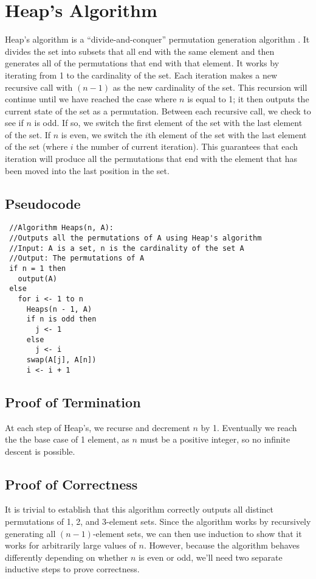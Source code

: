 \documentclass[10pt, oneside]{article}   	%
\begin{document}
\section{Heap's Algorithm}
Heap's algorithm is a ``divide-and-conquer'' permutation generation algorithm \cite{heap}. It divides the set into subsets that all end with the same element and then generates all of the permutations that end with that element. It works by iterating from 1 to the cardinality of the set. Each iteration makes a new recursive call with $(n - 1)$ as the new cardinality of the set. This recursion will continue until we have reached the case where $n$ is equal to 1; it then outputs the current state of the set as a permutation. Between each recursive call, we check to see if $n$ is odd. If so, we switch the first element of the set with the last element of the set. If $n$ is even, we switch the $i$th element of the set with the last element of the set (where $i$ the number of current iteration). This guarantees that each iteration will produce all the permutations that end with the element that has been moved into the last position in the set.

\subsection{Pseudocode}
\begin{verbatim}
 //Algorithm Heaps(n, A):
 //Outputs all the permutations of A using Heap's algorithm
 //Input: A is a set, n is the cardinality of the set A
 //Output: The permutations of A
 if n = 1 then
   output(A)
 else
   for i <- 1 to n
     Heaps(n - 1, A)
     if n is odd then
       j <- 1
     else
       j <- i
     swap(A[j], A[n])
     i <- i + 1
\end{verbatim}

\subsection{Proof of Termination}

At each step of Heap's, we recurse and decrement $n$ by 1. Eventually we reach the the base case of 1 element, as $n$ must be a positive integer, so no infinite descent is possible.

\subsection{Proof of Correctness}

It is trivial to establish that this algorithm correctly outputs all distinct permutations of 1, 2, and 3-element sets. Since the algorithm works by recursively generating all $(n - 1)$-element sets, we can then use induction to show that it works for arbitrarily large values of $n$. However, because the algorithm behaves differently depending on whether $n$ is even or odd, we'll need two separate inductive steps to prove correctness.
\end{document}
